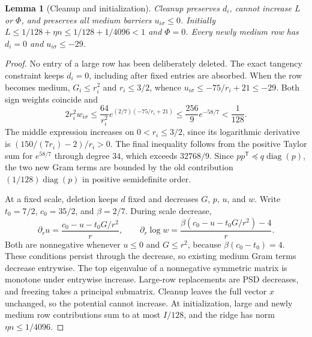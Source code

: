 \documentclass[11pt]{amsart}
\newtheorem{lemma}[theorem]{Lemma}
\theoremstyle{definition}\newtheorem{definition}[theorem]{Definition}
\theoremstyle{remark}\newtheorem{remark}[theorem]{Remark}
\numberwithin{equation}{section}
\newcommand{\diag}{\operatorname{diag}}
\newcommand{\T}{\mathsf T}
\begin{document}
\begin{lemma}[Cleanup and initialization]\label{b:lem:cleanup}
Cleanup preserves $d_i$, cannot increase $L$ or $\Phi$, and preserves all
medium barriers $u_{i\sigma}\le0$. Initially
$L\le1/128+\eta n\le1/128+1/4096<1$ and $\Phi=0$. Every newly medium row has $d_i=0$ and
$u_{i\sigma}\le-29$.
\end{lemma}
\begin{proof}
No entry of a large row has been deliberately deleted. The exact tangency
constraint keeps
$d_i=0$, including after fixed entries are absorbed. When the row becomes medium,
$G_i\le r_i^2$ and $r_i\le3/2$, whence
$u_{i\sigma}\le-75/r_i+21\le-29$. Both sign weights coincide and
\[
 2r_i^2w_{i\sigma}\le\frac{64}{r_i^2}
       e^{(2/7)(-75/r_i+21)}
 \le\frac{256}{9}e^{-58/7}<\frac1{128}.
\]
The middle expression increases on $0<r_i\le3/2$, since its logarithmic
derivative is $(150/(7r_i)-2)/r_i>0$. The final inequality follows
from the positive Taylor sum for $e^{58/7}$ through degree $34$, which exceeds
$32768/9$. Since $pp^\T\preceq q\diag(p)$, the two new Gram terms are
bounded by the old contribution $(1/128)\diag(p)$ in positive semidefinite order.

At a fixed scale, deletion keeps $d$ fixed and decreases $G$, $p$, $u$, and
$w$. Write $t_0=7/2$, $c_0=35/2$, and $\beta=2/7$. During scale decrease,
\[
 \partial_r u=\frac{c_0-u-t_0G/r^2}{r},\qquad
 \partial_r\log w=\frac{\beta(c_0-u-t_0G/r^2)-4}{r}.
\]
Both are nonnegative whenever $u\le0$ and $G\le r^2$, because
$\beta(c_0-t_0)=4$. These conditions persist through the decrease, so existing
medium Gram terms decrease entrywise. The top eigenvalue of a nonnegative
symmetric matrix is monotone under entrywise increase. Large-row replacements
are PSD decreases, and freezing takes a principal submatrix. Cleanup leaves the full vector
$x$ unchanged, so the potential cannot increase. At initialization,
large and newly medium row contributions sum to at most $I/128$, and the ridge
has norm $\eta n\le1/4096$.
\end{proof}
\end{document}
